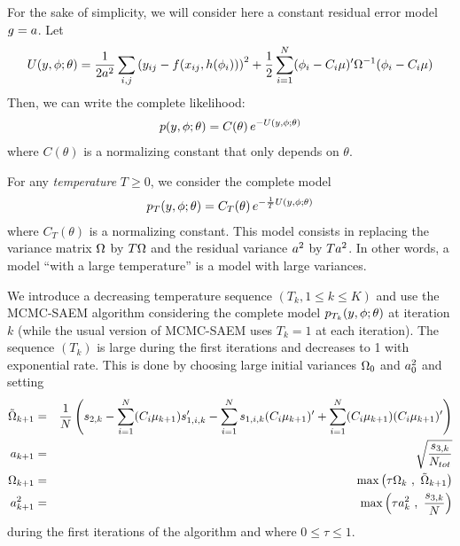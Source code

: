 For the sake of simplicity, we will consider here a constant residual error model $g=a$. Let
$$ U(\yg,\phig;\theta) = \frac{1}{2\ag^2} \sum_{i,j}\left(y_{ij} - f(x_{ij},h(\phigi)) \right)^2
+\frac{1}{2}\sum_{i=1}^{N}(\phigi-\magi\fixed_effect)^\prime \IIV^{-1}(\phigi-\magi\fixed_effect)$$ Then, we can write the complete likelihood:
\begin{eqnarray*}
p(y,{\phi};\theta)  =  C(\theta)\, e^{-U(y,{\phi};\theta)}
\end{eqnarray*}
where $C(\theta)$ is a normalizing constant that only depends on $\theta$.

For any {\it temperature} $T\geq0$, we consider the complete model
\begin{eqnarray*}
p_T(y,{\phi};\theta)  =  C_T(\theta)\, e^{-\frac{1}{T}U(y,{\phi};\theta)}
\end{eqnarray*}
where $C_T(\theta)$ is a normalizing constant. This model consists in replacing the variance matrix
${\Omega}$ by $T{\Omega}$ and the residual variance $a^2$ by $Ta^2$. In other words, a model ``with
a large temperature'' is a model with large variances.

We introduce a decreasing temperature sequence $(T_k, 1\leq k \leq K)$ and use the MCMC-SAEM
algorithm considering the complete model $p_{T_k}(y,{\phi};\theta)$  at iteration $k$ (while the
usual version of MCMC-SAEM uses $T_k=1$ at each iteration). The sequence $(T_k)$ is large during
the first iterations and decreases to 1 with exponential rate. This is done by choosing large
initial variances ${\Omega}_0$ and $a^2_0$ and setting
\begin{eqnarray}
 \tilde{\IIV}_{k+1} &=& \frac{1}{N} \left(s_{2,k}- \sum_{i=1}^N(\magi\mugkun)s_{1,i,k}^\prime -\sum_{i=1}^N s_{1,i,k}(\magi\mugkun)^\prime +\sum_{i=1}^N (\magi\mugkun)(\magi\mugkun)^\prime\right)  \\
\ag_{k+1} & = & \sqrt{ \frac{s_{3,k}}{N_{tot}} }\\
\IIV_{k+1} &=& \max\left( \tau \IIV_{k}  \ , \ \tilde{\IIV}_{k+1}  \right)  \label{tau1} \\
\ag^2_{k+1} & = &  \max\left( \tau \ag^2_{k} \ , \  \frac{s_{3,k}}{N} \right) \label{tau2}
\end{eqnarray}
during the first iterations of the algorithm and where $0\leq\tau\leq 1$.

